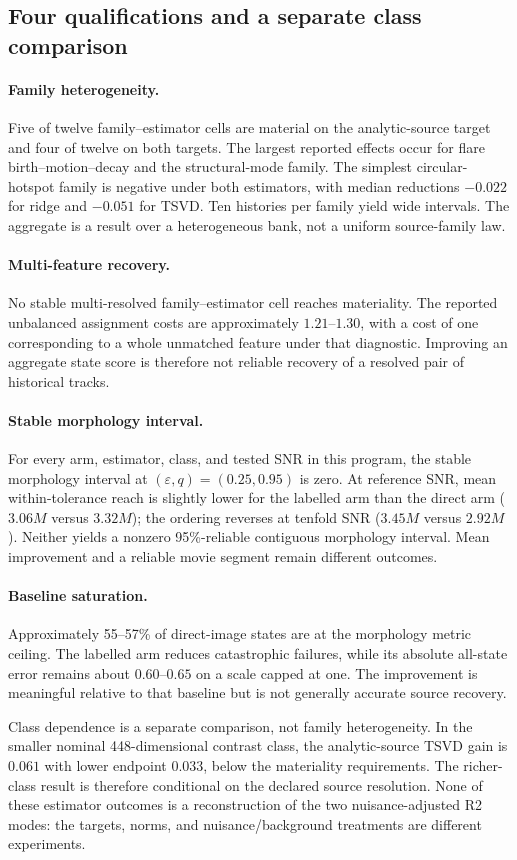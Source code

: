 \subsection{Four qualifications and a separate class comparison}
\paragraph{Family heterogeneity.}
Five of twelve family--estimator cells are material on the analytic-source target and four of twelve on both targets. The largest reported effects occur for flare birth--motion--decay and the structural-mode family. The simplest circular-hotspot family is negative under both estimators, with median reductions $-0.022$ for ridge and $-0.051$ for TSVD. Ten histories per family yield wide intervals. The aggregate is a result over a heterogeneous bank, not a uniform source-family law.

\paragraph{Multi-feature recovery.}
No stable multi-resolved family--estimator cell reaches materiality. The reported unbalanced assignment costs are approximately $1.21$--$1.30$, with a cost of one corresponding to a whole unmatched feature under that diagnostic. Improving an aggregate state score is therefore not reliable recovery of a resolved pair of historical tracks.

\paragraph{Stable morphology interval.}
For every arm, estimator, class, and tested SNR in this program, the stable morphology interval at $(\varepsilon,q)=(0.25,0.95)$ is zero. At reference SNR, mean within-tolerance reach is slightly lower for the labelled arm than the direct arm ($3.06M$ versus $3.32M$); the ordering reverses at tenfold SNR ($3.45M$ versus $2.92M$). Neither yields a nonzero 95\%-reliable contiguous morphology interval. Mean improvement and a reliable movie segment remain different outcomes.

\paragraph{Baseline saturation.}
Approximately 55--57\% of direct-image states are at the morphology metric ceiling. The labelled arm reduces catastrophic failures, while its absolute all-state error remains about $0.60$--$0.65$ on a scale capped at one. The improvement is meaningful relative to that baseline but is not generally accurate source recovery.

Class dependence is a separate comparison, not family heterogeneity. In the smaller nominal 448-dimensional contrast class, the analytic-source TSVD gain is $0.061$ with lower endpoint $0.033$, below the materiality requirements. The richer-class result is therefore conditional on the declared source resolution. None of these estimator outcomes is a reconstruction of the two nuisance-adjusted R2 modes: the targets, norms, and nuisance/background treatments are different experiments.
\FloatBarrier
